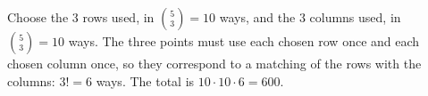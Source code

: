 Choose the $3$ rows used, in $\binom{5}{3}=10$ ways, and the $3$ columns used, in $\binom{5}{3}=10$ ways. The three points must use each chosen row once and each chosen column once, so they correspond to a matching of the rows with the columns: $3!=6$ ways. The total is $10\cdot10\cdot6=\boxed{600}$.
